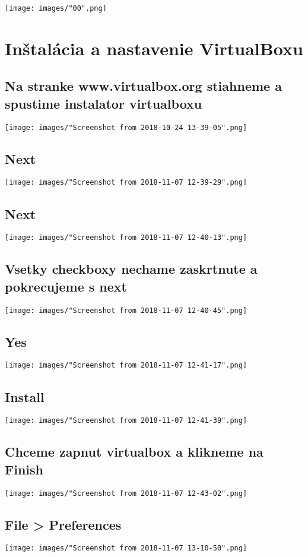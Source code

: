 \documentclass[slovak]{article}
\begin{document}
  
  \texttt{[image: images/"00".png]}

  \newpage
  \tableofcontents

  \newpage
  \centering
  \section{Inštalácia a nastavenie VirtualBoxu}
  \subsection{Na stranke www.virtualbox.org stiahneme a spustime instalator virtualboxu}
  \texttt{[image: images/"Screenshot from 2018-10-24 13-39-05".png]}
  \subsection{Next}
  \texttt{[image: images/"Screenshot from 2018-11-07 12-39-29".png]}
  \subsection{Next}
  \texttt{[image: images/"Screenshot from 2018-11-07 12-40-13".png]}
  \subsection{Vsetky checkboxy nechame zaskrtnute a pokrecujeme s next}
  \texttt{[image: images/"Screenshot from 2018-11-07 12-40-45".png]}
  \subsection{Yes}
  \texttt{[image: images/"Screenshot from 2018-11-07 12-41-17".png]}
  \subsection{Install}
  \texttt{[image: images/"Screenshot from 2018-11-07 12-41-39".png]}
  \subsection{Chceme zapnut virtualbox a klikneme na Finish}
  \texttt{[image: images/"Screenshot from 2018-11-07 12-43-02".png]}
  \subsection{File > Preferences}
  \texttt{[image: images/"Screenshot from 2018-11-07 13-10-50".png]}
\end{document}
